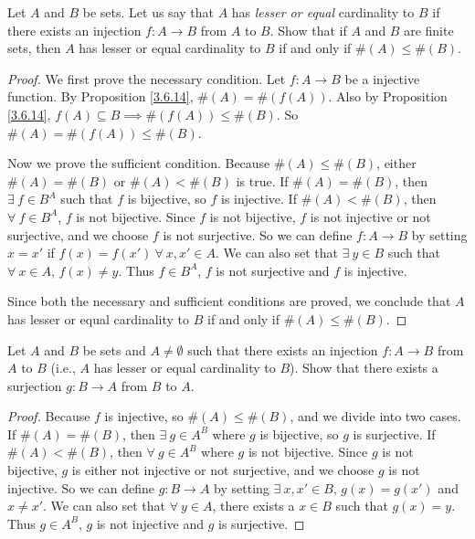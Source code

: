 \begin{exercise}\label{ex 3.6.7}
Let \(A\) and \(B\) be sets.
Let us say that \(A\) has \emph{lesser or equal} cardinality to \(B\) if there exists an injection \(f : A \to B\) from \(A\) to \(B\).
Show that if \(A\) and \(B\) are finite sets, then \(A\) has lesser or equal cardinality to \(B\) if and only if \(\#(A) \leq \#(B)\).
\end{exercise}

\begin{proof}
We first prove the necessary condition.
Let \(f : A \to B\) be a injective function.
By Proposition \ref{3.6.14}, \(\#(A) = \#(f(A))\).
Also by Proposition \ref{3.6.14}, \(f(A) \subseteq B \implies \#(f(A)) \leq \#(B)\).
So \(\#(A) = \#(f(A)) \leq \#(B)\).

Now we prove the sufficient condition.
Because \(\#(A) \leq \#(B)\), either \(\#(A) = \#(B)\) or \(\#(A) < \#(B)\) is true.
If \(\#(A) = \#(B)\), then \(\exists\ f \in B^A\) such that \(f\) is bijective, so \(f\) is injective.
If \(\#(A) < \#(B)\), then \(\forall\ f \in B^A\), \(f\) is not bijective.
Since \(f\) is not bijective, \(f\) is not injective or not surjective, and we choose \(f\) is not surjective.
So we can define  \(f : A \to B\) by setting \(x = x'\) if \(f(x) = f(x') \ \forall\ x, x' \in A\).
We can also set that \(\exists\ y \in B\) such that \(\forall\ x \in A\), \(f(x) \neq y\).
Thus \(f \in B^A\), \(f\) is not surjective and \(f\) is injective.

Since both the necessary and sufficient conditions are proved, we conclude that \(A\) has lesser or equal cardinality to \(B\) if and only if \(\#(A) \leq \#(B)\).
\end{proof}

\begin{exercise}\label{ex 3.6.8}
Let \(A\) and \(B\) be sets and \(A \neq \emptyset\) such that there exists an injection \(f : A \to B\) from \(A\) to \(B\) (i.e., \(A\) has lesser or equal cardinality to \(B\)).
Show that there exists a surjection \(g : B \to A\) from \(B\) to \(A\).
\end{exercise}

\begin{proof}
Because \(f\) is injective, so \(\#(A) \leq \#(B)\), and we divide into two cases.
If \(\#(A) = \#(B)\), then \(\exists\ g \in A^B\) where \(g\) is bijective, so \(g\) is surjective.
If \(\#(A) < \#(B)\), then \(\forall\ g \in A^B\) where \(g\) is not bijective.
Since \(g\) is not bijective, \(g\) is either not injective or not surjective, and we choose \(g\) is not injective.
So we can define \(g : B \to A\) by setting \(\exists\ x, x' \in B\), \(g(x) = g(x')\) and \(x \neq x'\).
We can also set that \(\forall\ y \in A\), there exists a \(x \in B\) such that \(g(x) = y\).
Thus \(g \in A^B\), \(g\) is not injective and \(g\) is surjective.
\end{proof}

